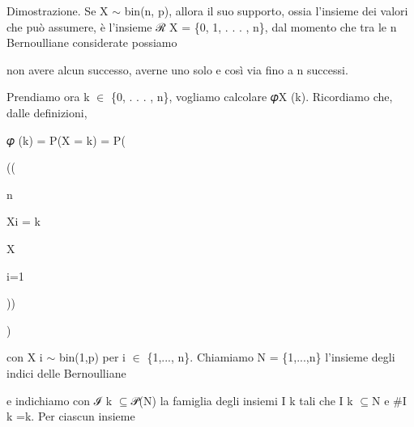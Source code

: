 \documentclass[a4paper,portrait,12pt]{article}
\begin{document}
\begin{flushleft}
Dimostrazione. Se X $\sim$ bin(n, p), allora il suo supporto, ossia l'insieme dei valori che pu\`{o} assumere, \`{e} l'insieme ℛ X = \{0, 1, . . . , n\}, dal momento che tra le n Bernoulliane considerate possiamo
\end{flushleft}


\begin{flushleft}
non avere alcun successo, averne uno solo e così via fino a n successi.
\end{flushleft}


\begin{flushleft}
Prendiamo ora k $\in$ \{0, . . . , n\}, vogliamo calcolare 𝜑X (k). Ricordiamo che, dalle definizioni,
\end{flushleft}


\begin{flushleft}
𝜑 (k) = P(X = k) = P(
\end{flushleft}


((





\begin{flushleft}
n
\end{flushleft}





\begin{flushleft}
Xi = k
\end{flushleft}





\begin{flushleft}
X
\end{flushleft}





\begin{flushleft}
i=1
\end{flushleft}





))


)





\begin{flushleft}
con X i $\sim$ bin(1,p) per i $\in$ \{1,..., n\}. Chiamiamo N = \{1,...,n\} l'insieme degli indici delle Bernoulliane
\end{flushleft}


\begin{flushleft}
e indichiamo con ℐ k $\subseteq$𝒫(N) la famiglia degli insiemi I k tali che I k $\subseteq$N e \#I k =k. Per ciascun insieme
\end{flushleft}
\end{document}
